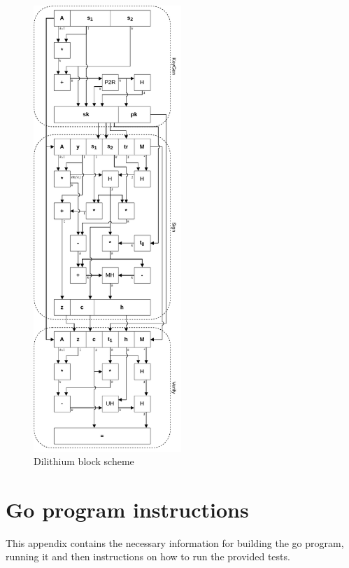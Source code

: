 \begin{figure}[ht!]
  \centering
  \includegraphics[width=0.497\textwidth]{pictures/dil_all.pdf}
  \caption{Dilithium block scheme}
  \label{img:dil_all}
\end{figure}

\chapter{Go program instructions}
This appendix contains the necessary information for building the go program, running it and then instructions on how to run the provided tests.
\label{ch:go_instructions}
